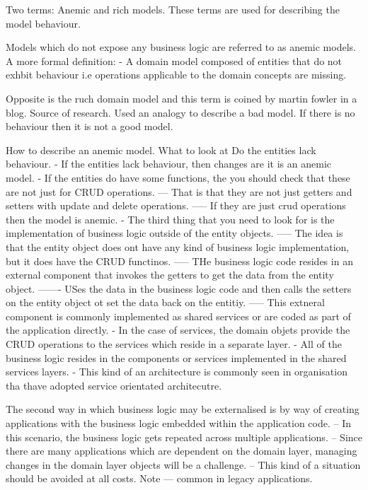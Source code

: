 Two terms: Anemic and rich models.
These terms are used for describing the model behaviour.

Models which do not expose any business logic are referred to as anemic models.
A more formal definition:
- A domain model composed of entities that do not exhbit behaviour i.e operations applicable to the domain concepts are missing.

Opposite is the ruch domain model and this term is coined by martin fowler in a blog. Source of research.
Used an analogy to describe a bad model.
If there is no behaviour then it is not a good model.

How to describe an anemic model. What to look at
Do the entities lack behaviour.
- If the entities lack behaviour, then changes are it is an anemic model.
- If the entities do have some functions, the you should check that these are not just for CRUD operations.
--- That is that they are not just getters and setters with update and delete operations.
----- If they are just crud operations then the model is anemic.
- The third thing that you need to look for is the implementation of business logic outside of the entity objects.
----- The idea is that the entity object does ont have any kind of business logic implementation, but it does have the CRUD functinos.
----- THe business logic code resides in an external component that invokes the getters to get the data from the entity object.
------- USes the data in the business logic code and then calls the setters on the entity object ot set the data back on the entitiy.
----- This extneral component is commonly implemented as shared services or are coded as part of the application directly.
- In the case of services, the domain objets provide the CRUD operations to the services which reside in a separate layer.
- All of the business logic resides in the components or services implemented in the shared services layers.
- This kind of an architecture is commonly seen in organisation tha thave adopted service orientated architecutre.

The second way in which business logic may be externalised is by way of creating applications with the business logic embedded within the application code.
-- In this scenario, the business logic gets repeated across multiple applications.
-- Since there are many applications which are dependent on the domain layer, managing changes in the domain layer objects will be a challenge.
-- This kind of a situation should be avoided at all costs.
Note --- common in legacy applications.



